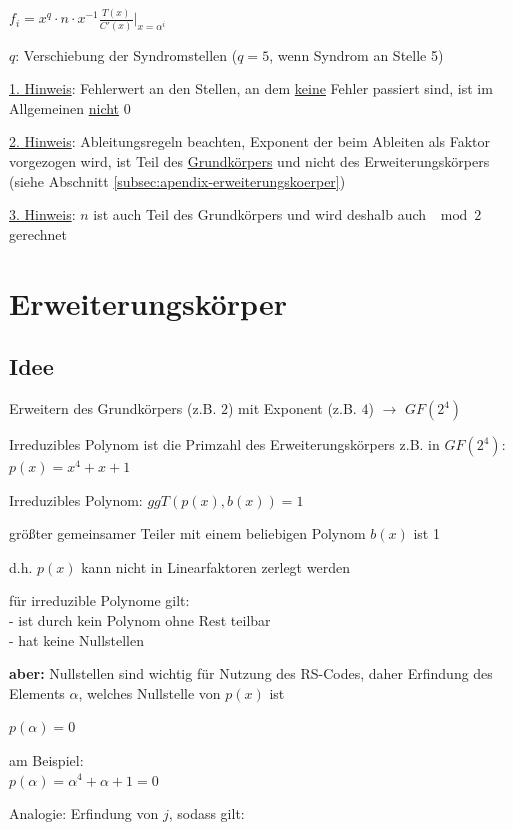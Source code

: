 $\displaystyle{
    f_i = x^q \cdot n \cdot x^{-1} \frac{T(x)}{C'(x)}\bigg \vert_{x=\alpha^i}
}$

$q$: Verschiebung der Syndromstellen ($q=5$, wenn Syndrom an Stelle 5)

\underline{1. Hinweis}: Fehlerwert an den Stellen, an dem \underline{keine} Fehler passiert sind, ist im Allgemeinen
\underline{nicht} 0

\underline{2. Hinweis}: Ableitungsregeln beachten, Exponent der beim Ableiten als Faktor vorgezogen wird, ist Teil des
\underline{Grundkörpers} und nicht des Erweiterungskörpers (siehe Abschnitt \ref{subsec:apendix-erweiterungskoerper})

\underline{3. Hinweis}: $n$ ist auch Teil des Grundkörpers und wird deshalb auch $\mod 2$ gerechnet

\section{Erweiterungskörper}

\subsection{Idee}

Erweitern des Grundkörpers (z.B. $2$) mit Exponent (z.B. $4$) $\rightarrow$
$GF(2^4)$

Irreduzibles Polynom ist die Primzahl des Erweiterungskörpers z.B. in $GF(2^4)$:\\
$\displaystyle{
    p(x) = x^4 + x + 1
}$

Irreduzibles Polynom: $ggT(p(x), b(x)) = 1$

größter gemeinsamer Teiler mit einem beliebigen Polynom $b(x)$ ist 1

d.h. $p(x)$ kann nicht in Linearfaktoren zerlegt werden

für irreduzible Polynome gilt:\\
- ist durch kein Polynom ohne Rest teilbar\\
- hat keine Nullstellen

\textbf{aber:} Nullstellen sind wichtig für Nutzung des RS-Codes, daher \frqq Erfindung\flqq{} des
Elements $\alpha$, welches Nullstelle von $p(x)$ ist

$\displaystyle{
    p(\alpha) = 0
}$

am Beispiel:\\
$\displaystyle{
    p(\alpha) = \alpha^4 + \alpha + 1 = 0
}$

Analogie: \frqq Erfindung\flqq{} von $j$, sodass gilt:

